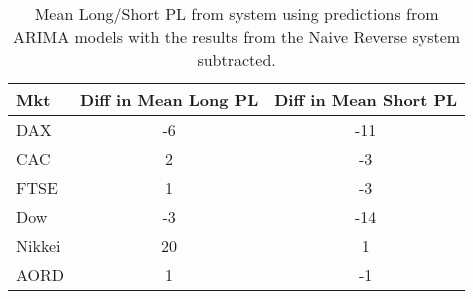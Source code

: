 \begin{table}[ht]
\centering
\caption[Mean PL from ARIMA models minus mean PL from Naive Reverse system]{Mean Long/Short PL from system using predictions from ARIMA models with the results from the Naive Reverse system subtracted.} 
\label{tab:chp_ts:arima1_diff}
\begin{tabular}{lcc}
  \toprule Mkt & Diff in Mean Long PL & Diff in Mean Short PL \\ 
  \midrule DAX & -6 & -11 \\ 
  CAC & 2 & -3 \\ 
  FTSE & 1 & -3 \\ 
  Dow & -3 & -14 \\ 
  Nikkei & 20 & 1 \\ 
  AORD & 1 & -1 \\ 
   \bottomrule \end{tabular}
\end{table}

